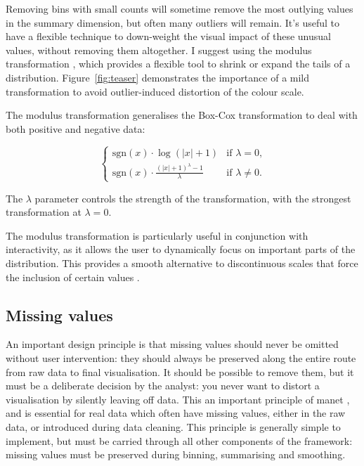 \documentclass[journal]{vgtc}                %
\begin{document}
Removing bins with small counts will sometime remove the most outlying values in the summary dimension, but often many outliers will remain. It's useful to have a flexible technique to down-weight the visual impact of these unusual values, without removing them altogether. I suggest using the modulus transformation \citep{john:1980}, which provides a flexible tool to shrink or expand the tails of a distribution. Figure~\ref{fig:teaser} demonstrates the importance of a mild transformation to avoid outlier-induced distortion of the colour scale.

The modulus transformation generalises the Box-Cox transformation \citep{box:1964} to deal with both positive and negative data: 

\begin{equation}
\begin{cases} 
  \text{sgn}(x) \cdot \log(|x| + 1) & \text{if $\lambda = 0$,} \\
  \text{sgn}(x) \cdot \frac{(|x| + 1)^\lambda - 1}{\lambda} &\text{if $\lambda \ne 0$.}
\end{cases}
\end{equation}

The $\lambda$ parameter controls the strength of the transformation, with the strongest transformation at $\lambda = 0$. 

The modulus transformation is particularly useful in conjunction with interactivity, as it allows the user to dynamically focus on important parts of the distribution. This provides a smooth alternative to discontinuous scales that force the inclusion of certain values \citep{kandel:2012}.

\subsection{Missing values}
\label{sub:missing}

An important design principle is that missing values should never be omitted without user intervention: they should always be preserved along the entire route from raw data to final visualisation. It should be possible to remove them, but it must be a deliberate decision by the analyst: you never want to distort a visualisation by silently leaving off data. This an important principle of {\sc manet} \citep{unwin:1996}, and is essential for real data which often have missing values, either in the raw data, or introduced during data cleaning. This principle is generally simple to implement, but must be carried through all other components of the framework: missing values must be preserved during binning, summarising and smoothing.
\end{document}
